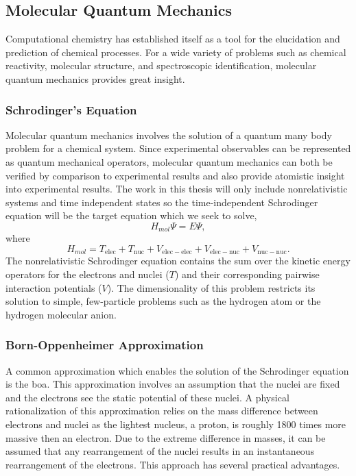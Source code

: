 \subsection{Molecular Quantum Mechanics}
Computational chemistry has established itself as a tool for the elucidation and prediction of chemical processes.
For a wide variety of problems such as chemical reactivity, molecular structure, and spectroscopic identification, molecular quantum mechanics provides great insight.

\subsubsection{Schrodinger's Equation}
Molecular quantum mechanics involves the solution of a quantum many body problem for a chemical system. Since experimental observables can be represented as quantum mechanical operators, molecular quantum mechanics can both be verified by comparison to experimental results and also provide atomistic insight into experimental results.
The work in this thesis will only include nonrelativistic systems and time independent states so the time-independent Schrodinger equation will be the target equation which we seek to solve,
\begin{equation}
H_{mol} \Psi = E \Psi,
\end{equation}
where
\begin{equation}
H_{mol} = T_{\mathrm{elec}} + T_{\mathrm{nuc}} + V_{\mathrm{elec-elec}} + V_{\mathrm{elec-nuc}} + V_{\mathrm{nuc-nuc}}.
\end{equation}
The nonrelativistic Schrodinger equation contains the sum over the kinetic energy operators for the electrons and nuclei ($T$) and their corresponding pairwise interaction potentials ($V$).
The dimensionality of this problem restricts its solution to simple, few-particle problems such as the hydrogen atom or the hydrogen molecular anion.

\subsubsection{Born-Oppenheimer Approximation}
A common approximation which enables the solution of the Schrodinger equation is the \gls{boa}.
This approximation involves an assumption that the nuclei are fixed and the electrons see the static potential of these nuclei.
A physical rationalization of this approximation relies on the mass difference between electrons and nuclei as the lightest nucleus, a proton, is roughly 1800 times more massive then an electron.
Due to the extreme difference in masses, it can be assumed that any rearrangement of the nuclei results in an instantaneous rearrangement of the electrons.
This approach has several practical advantages.

